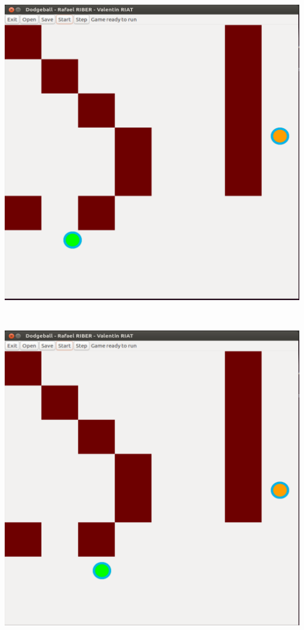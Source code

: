 \documentclass[a4paper, 11pt]{article}
\begin{document}
\begin{minipage}{0.33333333\textwidth}
\includegraphics[width=\textwidth]{figures/sim3.PNG}
\end{minipage}\\
\begin{minipage}{0.33333333\textwidth}
\includegraphics[width=\textwidth]{figures/sim4.PNG}
\end{minipage}
\end{document}
